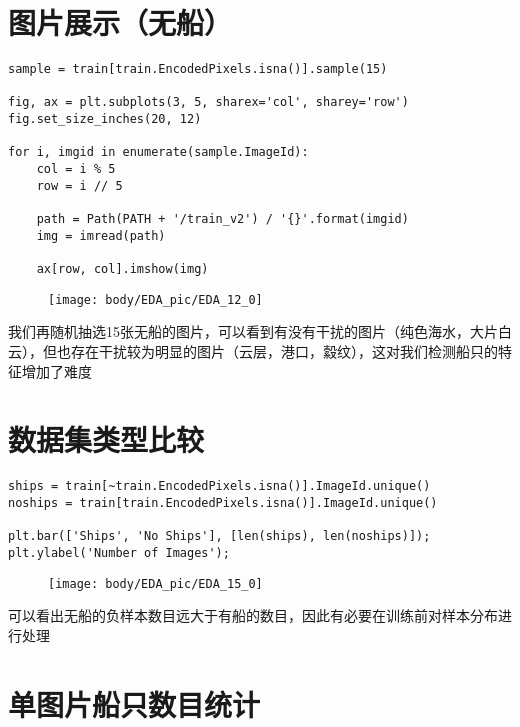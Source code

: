 \section{图片展示（无船）}\label{ux56feux7247ux5c55ux793aux65e0ux8239}

\begin{lstlisting}
sample = train[train.EncodedPixels.isna()].sample(15)

fig, ax = plt.subplots(3, 5, sharex='col', sharey='row')
fig.set_size_inches(20, 12)

for i, imgid in enumerate(sample.ImageId):
    col = i % 5
    row = i // 5
    
    path = Path(PATH + '/train_v2') / '{}'.format(imgid)
    img = imread(path)
    
    ax[row, col].imshow(img)
\end{lstlisting}

\begin{figure}[htbp]
\centering
\texttt{[image: body/EDA\_pic/EDA\_12\_0]}
\caption{}
\end{figure}

我们再随机抽选15张无船的图片，可以看到有没有干扰的图片（纯色海水，大片白云），但也存在干扰较为明显的图片（云层，港口，縠纹），这对我们检测船只的特征增加了难度

\section{数据集类型比较}\label{ux6570ux636eux96c6ux7c7bux578bux6bd4ux8f83}

\begin{lstlisting}
ships = train[~train.EncodedPixels.isna()].ImageId.unique()
noships = train[train.EncodedPixels.isna()].ImageId.unique()

plt.bar(['Ships', 'No Ships'], [len(ships), len(noships)]);
plt.ylabel('Number of Images');
\end{lstlisting}

\begin{figure}[htbp]
\centering
\texttt{[image: body/EDA\_pic/EDA\_15\_0]}
\caption{}
\end{figure}

可以看出无船的负样本数目远大于有船的数目，因此有必要在训练前对样本分布进行处理

\section{单图片船只数目统计}\label{ux5355ux56feux7247ux8239ux53eaux6570ux76eeux7edfux8ba1}

